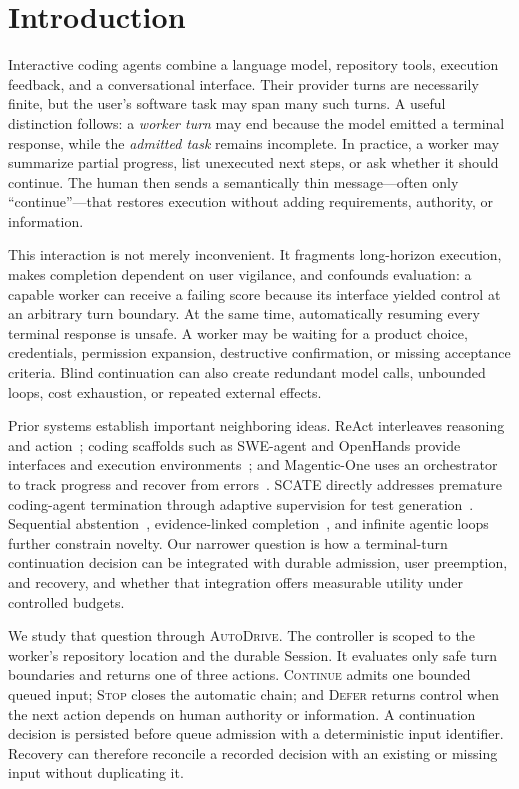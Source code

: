 \documentclass[sigconf,nonacm]{acmart}
\newcommand{\system}{\textsc{AutoDrive}}
\newcommand{\continueaction}{\textsc{Continue}}
\newcommand{\stopaction}{\textsc{Stop}}
\newcommand{\deferaction}{\textsc{Defer}}
\begin{document}
\section{Introduction}

Interactive coding agents combine a language model, repository tools, execution feedback, and a conversational interface. Their provider turns are necessarily finite, but the user's software task may span many such turns. A useful distinction follows: a \emph{worker turn} may end because the model emitted a terminal response, while the \emph{admitted task} remains incomplete. In practice, a worker may summarize partial progress, list unexecuted next steps, or ask whether it should continue. The human then sends a semantically thin message---often only ``continue''---that restores execution without adding requirements, authority, or information.

This interaction is not merely inconvenient. It fragments long-horizon execution, makes completion dependent on user vigilance, and confounds evaluation: a capable worker can receive a failing score because its interface yielded control at an arbitrary turn boundary. At the same time, automatically resuming every terminal response is unsafe. A worker may be waiting for a product choice, credentials, permission expansion, destructive confirmation, or missing acceptance criteria. Blind continuation can also create redundant model calls, unbounded loops, cost exhaustion, or repeated external effects.

Prior systems establish important neighboring ideas. ReAct interleaves reasoning and action~\cite{yao2023react}; coding scaffolds such as SWE-agent and OpenHands provide interfaces and execution environments~\cite{yang2024sweagent,wang2024openhands}; and Magentic-One uses an orchestrator to track progress and recover from errors~\cite{fourney2024magenticone}. SCATE directly addresses premature coding-agent termination through adaptive supervision for test generation~\cite{gu2026scate}. Sequential abstention~\cite{luo2026abstention}, evidence-linked completion~\cite{liu2026ect}, and infinite agentic loops~\cite{hou2026loops} further constrain novelty. Our narrower question is how a terminal-turn continuation decision can be integrated with durable admission, user preemption, and recovery, and whether that integration offers measurable utility under controlled budgets.

We study that question through \system. The controller is scoped to the worker's repository location and the durable Session. It evaluates only safe turn boundaries and returns one of three actions. \continueaction{} admits one bounded queued input; \stopaction{} closes the automatic chain; and \deferaction{} returns control when the next action depends on human authority or information. A continuation decision is persisted before queue admission with a deterministic input identifier. Recovery can therefore reconcile a recorded decision with an existing or missing input without duplicating it.
\end{document}
